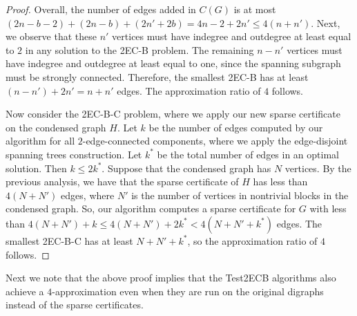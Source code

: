 \documentclass[11pt]{article}
\begin{document}
\begin{proof}
Overall, the number of edges added in $C(G)$ is at most $(2n - b - 2) + (2n -b) + (2n'+2b) = 4n - 2+ 2n' \le 4(n+n')$.
Next, we observe that these $n'$ vertices must have indegree and outdegree at least equal to $2$ in any solution to the \textsf{2EC-B} problem.
The remaining $n-n'$ vertices must have indegree and outdegree at least equal to one, since the spanning subgraph must be strongly connected.
Therefore, the smallest \textsf{2EC-B} has at least $(n-n') + 2n' = n + n'$ edges. The approximation ratio of $4$ follows.

Now consider the \textsf{2EC-B-C} problem, where we apply our new sparse certificate on the condensed graph $H$.
Let $k$ be the number of edges computed by our algorithm for all $2$-edge-connected components, where we apply the edge-disjoint spanning trees construction.
Let $k^{\ast}$ be the total number of edges in an optimal solution. Then $k \le 2 k^{\ast}$.
Suppose that the condensed graph has $N$ vertices.
By the previous analysis, we have that the sparse certificate of $H$ has less than $4(N+N')$ edges, where $N'$ is the number of vertices in nontrivial blocks in the condensed graph.
So, our algorithm computes a sparse certificate for $G$ with less than $4(N+N')+k \le 4(N+N') + 2k^{\ast} < 4 (N+N' + k^{\ast})$ edges.
The smallest \textsf{2EC-B-C} has at least $N+N'+k^{\ast}$, so the approximation ratio of $4$ follows.
\end{proof}

Next we note that the above proof implies that the \textsf{Test2ECB} algorithms also achieve a $4$-approximation even when they are run on the original digraphs instead of the sparse certificates.
\end{document}
